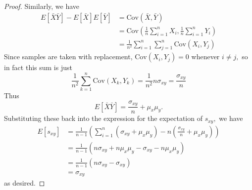 \documentclass{article}
\newcommand{\cov}{\mathrm{Cov}}
\begin{document}
\begin{enumerate}
\begin{proof}
			Similarly, we have 
			\begin{align*}
				E[\bar{X}\bar{Y}]-E[\bar{X}]E[\bar{Y}]&=\cov(\bar{X}, \bar{Y}) \\
				&= \cov\left( \frac{1}{n}\sum_{i=1}^{n} X_i, \frac{1}{n}\sum_{i=1}^{n}Y_i \right) \\
				&= \frac{1}{n^2} \sum_{i=1}^{n}\sum_{j=1}^{n}\cov(X_i, Y_j)
			\end{align*}
			Since samples are taken with replacement, $\cov(X_i, Y_j)=0$ whenever $i\neq j,$ so in fact this sum is just \[\frac{1}{n^2}\sum_{k=1}^{n}\cov(X_k, Y_k) = \frac{1}{n^2}n\sigma_{xy} = \frac{\sigma_{xy}}{n}\] Thus \[E[\bar{X}\bar{Y}]=\frac{\sigma_{xy}}{n}+\mu_x\mu_y.\] Substituting these back into the expression for the expectation of $s_{xy},$ we have 
			\begin{align*}
				E[s_{xy}] &= \frac{1}{n-1}\left( \sum_{i=1}^{n} (\sigma_{xy}+\mu_x\mu_y) - n\left( \frac{\sigma_{xy}}{n}+\mu_x\mu_y \right) \right) \\
				&= \frac{1}{n-1} \left( n\sigma_{xy}+n\mu_x\mu_y-\sigma_{xy}-n\mu_x\mu_y \right) \\
				&= \frac{1}{n-1}(n\sigma_{xy}-\sigma_{xy}) \\
				&= \sigma_{xy}
			\end{align*} as desired.

		\end{proof}

\end{enumerate}
\end{document}
